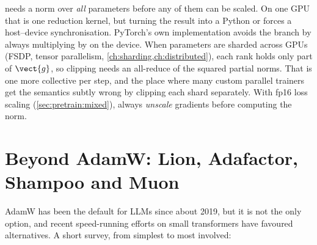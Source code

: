 \begin{systemslens}
 needs a norm over \emph{all} parameters before any of them can be scaled.
On one GPU that is one reduction kernel, but turning the result into a Python  or
 forces a host--device synchronisation. PyTorch's own implementation avoids the
branch by always multiplying by  on the device. When parameters are
sharded across GPUs (FSDP, tensor parallelism, \cref{ch:sharding,ch:distributed}), each rank
holds only part of $\vect{g}$, so clipping needs an all-reduce of the squared partial norms.
That is one more collective per step, and the place where many custom parallel trainers get the
semantics subtly wrong by clipping each shard separately. With fp16 loss scaling
(\cref{sec:pretrain:mixed}), always \emph{unscale} gradients before computing the norm.
\end{systemslens}

\section{Beyond AdamW: Lion, Adafactor, Shampoo and Muon}\label{sec:optim:beyond}

AdamW has been the default for LLMs since about 2019, but it is not the only option, and recent
speed-running efforts on small transformers have favoured alternatives. A short survey, from
simplest to most involved:

